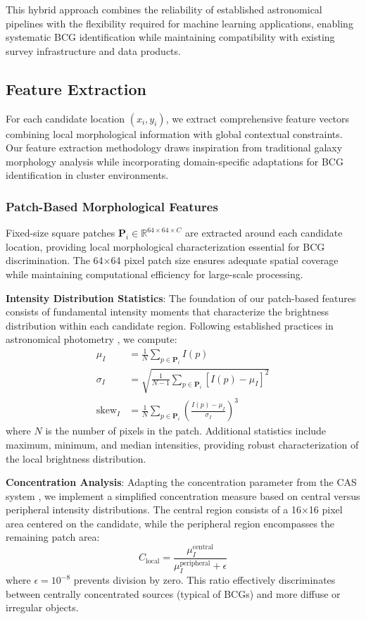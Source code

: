 \documentclass[twocolumn,10pt]{aastex631}
\begin{document}
This hybrid approach combines the reliability of established astronomical pipelines with the flexibility required for machine learning applications, enabling systematic BCG identification while maintaining compatibility with existing survey infrastructure and data products.

\subsection{Feature Extraction}

For each candidate location $(x_i, y_i)$, we extract comprehensive feature vectors combining local morphological information with global contextual constraints. Our feature extraction methodology draws inspiration from traditional galaxy morphology analysis \citep{Conselice2003} while incorporating domain-specific adaptations for BCG identification in cluster environments.

\subsubsection{Patch-Based Morphological Features}

Fixed-size square patches $\mathbf{P}_i \in \mathbb{R}^{64 \times 64 \times C}$ are extracted around each candidate location, providing local morphological characterization essential for BCG discrimination. The 64×64 pixel patch size ensures adequate spatial coverage while maintaining computational efficiency for large-scale processing.

\textbf{Intensity Distribution Statistics}: The foundation of our patch-based features consists of fundamental intensity moments that characterize the brightness distribution within each candidate region. Following established practices in astronomical photometry \citep{Bertin1996}, we compute:
\begin{align}
\mu_I &= \frac{1}{N} \sum_{p \in \mathbf{P}_i} I(p) \\
\sigma_I &= \sqrt{\frac{1}{N-1} \sum_{p \in \mathbf{P}_i} [I(p) - \mu_I]^2} \\
\text{skew}_I &= \frac{1}{N} \sum_{p \in \mathbf{P}_i} \left(\frac{I(p) - \mu_I}{\sigma_I}\right)^3
\end{align}
where $N$ is the number of pixels in the patch. Additional statistics include maximum, minimum, and median intensities, providing robust characterization of the local brightness distribution.

\textbf{Concentration Analysis}: Adapting the concentration parameter from the CAS system \citep{Conselice2003}, we implement a simplified concentration measure based on central versus peripheral intensity distributions. The central region consists of a 16×16 pixel area centered on the candidate, while the peripheral region encompasses the remaining patch area:
\begin{equation}
C_{\text{local}} = \frac{\mu_I^{\text{central}}}{\mu_I^{\text{peripheral}} + \epsilon}
\end{equation}
where $\epsilon = 10^{-8}$ prevents division by zero. This ratio effectively discriminates between centrally concentrated sources (typical of BCGs) and more diffuse or irregular objects.
\end{document}
